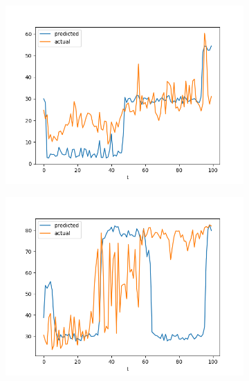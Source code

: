 \documentclass[runningheads]{llncs}
\begin{document}
\begin{figure}[hp]
\begin{subfigure}{\figwidth}
        \end{subfigure}
        \begin{subfigure}{\figwidth}
            \includegraphics[width=\textwidth]{results/evaluation/f_model_graph_p30.png}
        \end{subfigure}
        \begin{subfigure}{\figwidth}
            \includegraphics[width=\textwidth]{results/evaluation/f_model_graph_p40.png}
        \end{subfigure}
        \begin{subfigure}{\figwidth}

\end{subfigure}
\end{figure}
\end{document}
